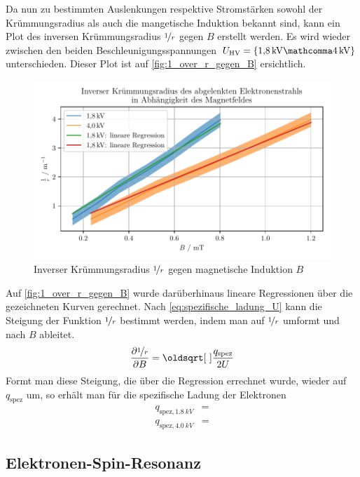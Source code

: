 \documentclass[ngerman]{scrartcl}
\begin{document}
%
Da nun zu bestimmten Auslenkungen respektive Stromstärken sowohl der Krümmungsradius als auch die mangetische Induktion bekannt sind, kann ein Plot des inversen Krümmungsradius $\nicefrac{1}{r}$ gegen $B$ erstellt werden. Es wird wieder zwischen den beiden Beschleunigungsspannungen $U_{\text{HV}}=\{\SI{1.8}{kV}\mathcomma\SI{4}{kV}\}$ unterschieden. Dieser Plot ist auf \autoref{fig:1_over_r_gegen_B} ersichtlich.
%
\begin{figure}[H]
    \centering
    \begin{samepage}
        \includegraphics[width=\linewidth]{../python/plots/kruemmungsradius.pdf}
        \caption[Inverser Krümmungsradius gegen $B$-Feld]{Inverser Krümmungsradius $\nicefrac{1}{r}$ gegen magnetische Induktion $B$}
        \label{fig:1_over_r_gegen_B}
    \end{samepage}
\end{figure}
%
Auf \autoref{fig:1_over_r_gegen_B} wurde darüberhinaus lineare Regressionen über die gezeichneten Kurven gerechnet. Nach \autoref{eq:spezifische_ladung_U} kann die Steigung der Funktion $\nicefrac{1}{r}$ bestimmt werden, indem man auf $\nicefrac{1}{r}$ umformt und nach $B$ ableitet.
\[\pdv{\nicefrac{1}{r}}{B} = \sqrt{\frac{q_{\text{spez}}}{2U}}\]
Formt man diese Steigung, die über die Regression errechnet wurde, wieder auf $q_{\text{spez}}$ um, so erhält man für die spezifische Ladung der Elektronen
\begin{align}
    q_{\text{spez},\SI{1.8}{kV}} & = \\
    q_{\text{spez},\SI{4.0}{kV}} & =
\end{align}


\subsection{Elektronen-Spin-Resonanz}
\label{subsec:auswertung_esr}
\end{document}
